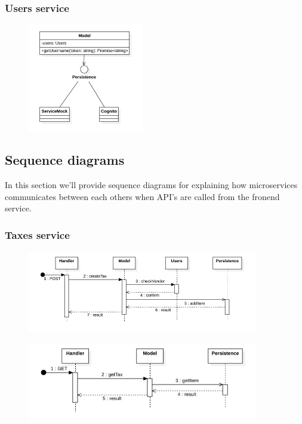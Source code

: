 \subsubsection{Users service}
\begin{figure}[H]
    \includegraphics[width=0.45\textwidth]{res/images/class-diagrams/users.png}
\end{figure}


\subsection{Sequence diagrams}
In this section we'll provide sequence diagrams for explaining how microservices communicates between each others
when API's are called from the fronend service.

\subsubsection{Taxes service}
\begin{figure}[H]
    \includegraphics[width=0.9\textwidth]{res/images/sequence-diagrams/taxes/createTax.png}
\end{figure}

\begin{figure}[H]
    \includegraphics[width=0.9\textwidth]{res/images/sequence-diagrams/taxes/getTax.png}
\end{figure}

